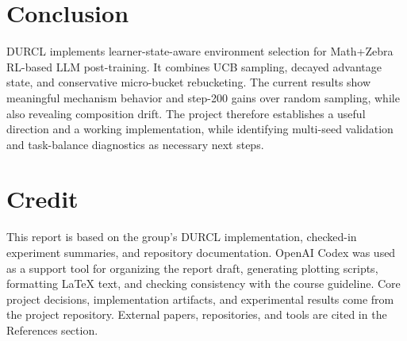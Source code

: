 \documentclass[10pt]{article}
\begin{document}
\section{Conclusion}

DURCL implements learner-state-aware environment selection for Math+Zebra RL-based LLM post-training. It combines UCB sampling, decayed advantage state, and conservative micro-bucket rebucketing. The current results show meaningful mechanism behavior and step-200 gains over random sampling, while also revealing composition drift. The project therefore establishes a useful direction and a working implementation, while identifying multi-seed validation and task-balance diagnostics as necessary next steps.




\section*{Credit}

This report is based on the group's DURCL implementation, checked-in experiment summaries, and repository documentation. OpenAI Codex was used as a support tool for organizing the report draft, generating plotting scripts, formatting LaTeX text, and checking consistency with the course guideline. Core project decisions, implementation artifacts, and experimental results come from the project repository. External papers, repositories, and tools are cited in the References section.
\end{document}
